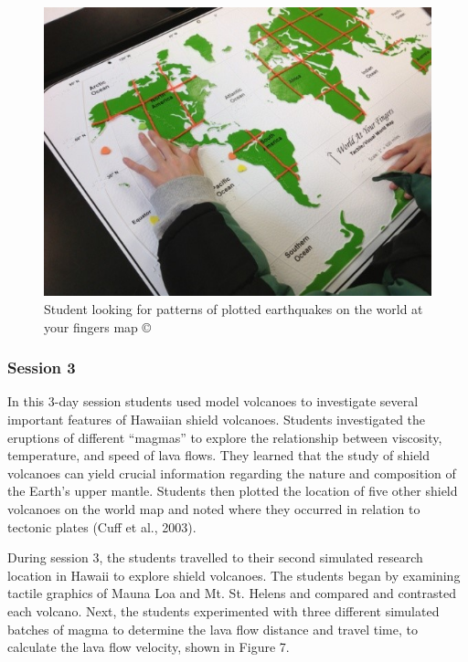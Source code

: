 \documentclass[11.5pt]{sig-alternate} %
\begin{document}
\begin{large}
\begin{figure}[h]
      \centering
      \includegraphics{images/fig6.jpg}
      \caption{Student looking for patterns of plotted earthquakes on the world at your fingers map ©}
  \end{figure}
  
\subsubsection*{Session 3} 

In this 3-day session students used model volcanoes to investigate several important features of Hawaiian shield volcanoes.  Students investigated the eruptions of different “magmas” to explore the relationship between viscosity, temperature, and speed of lava flows.  They learned that the study of shield volcanoes can yield crucial information regarding the nature and composition of the Earth’s upper mantle.  Students then plotted the location of five other shield volcanoes on the world map and noted where they occurred in relation to tectonic plates (Cuff et al., 2003).

During session 3, the students travelled to their second simulated research location in Hawaii to explore shield volcanoes.  The students began by examining tactile graphics of Mauna Loa and Mt. St. Helens and compared and contrasted each volcano.  Next, the students experimented with three different simulated batches of magma to determine the lava flow distance and travel time, to calculate the lava flow velocity, shown in Figure 7.  


\end{large}
\end{document}
